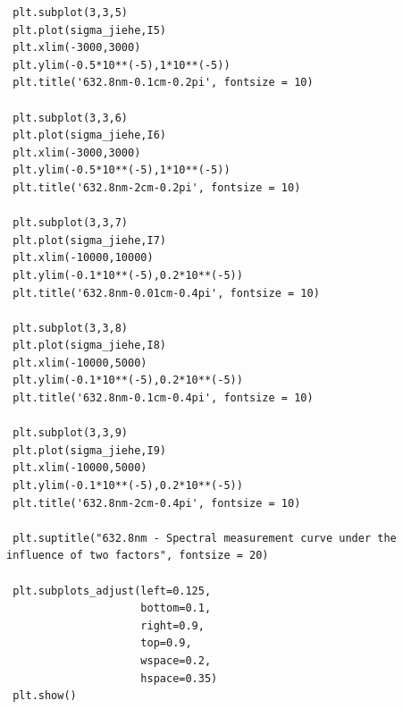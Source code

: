 \documentclass[conference]{IEEEtran}
\begin{document}
\begin{lstlisting}
 plt.subplot(3,3,5)
 plt.plot(sigma_jiehe,I5)
 plt.xlim(-3000,3000)
 plt.ylim(-0.5*10**(-5),1*10**(-5))
 plt.title('632.8nm-0.1cm-0.2pi', fontsize = 10)
    
 plt.subplot(3,3,6)
 plt.plot(sigma_jiehe,I6)
 plt.xlim(-3000,3000)
 plt.ylim(-0.5*10**(-5),1*10**(-5))
 plt.title('632.8nm-2cm-0.2pi', fontsize = 10)
    
 plt.subplot(3,3,7)
 plt.plot(sigma_jiehe,I7)
 plt.xlim(-10000,10000)
 plt.ylim(-0.1*10**(-5),0.2*10**(-5))
 plt.title('632.8nm-0.01cm-0.4pi', fontsize = 10)
    
 plt.subplot(3,3,8)
 plt.plot(sigma_jiehe,I8)
 plt.xlim(-10000,5000)
 plt.ylim(-0.1*10**(-5),0.2*10**(-5))
 plt.title('632.8nm-0.1cm-0.4pi', fontsize = 10)
    
 plt.subplot(3,3,9)
 plt.plot(sigma_jiehe,I9)
 plt.xlim(-10000,5000)
 plt.ylim(-0.1*10**(-5),0.2*10**(-5))
 plt.title('632.8nm-2cm-0.4pi', fontsize = 10)
    
 plt.suptitle("632.8nm - Spectral measurement curve under the influence of two factors", fontsize = 20) 
    
 plt.subplots_adjust(left=0.125,
                     bottom=0.1, 
                     right=0.9, 
                     top=0.9, 
                     wspace=0.2, 
                     hspace=0.35)
 plt.show()
    
\end{lstlisting}
\end{document}

